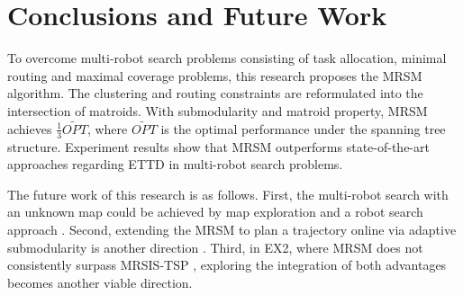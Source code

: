 \chapter{Conclusions and Future Work}
To overcome multi-robot search problems consisting of task allocation, minimal routing and maximal coverage problems, this research proposes the MRSM algorithm.
The clustering and routing constraints are reformulated into the intersection of matroids.
With submodularity and matroid property, MRSM achieves $\frac{1}{3}\widetilde{OPT}$, where $\widetilde{OPT}$ is the optimal performance under the spanning tree structure. 
Experiment results show that MRSM outperforms state-of-the-art approaches regarding ETTD in multi-robot search problems.


The future work of this research is as follows.
First, the multi-robot search with an unknown map could be achieved by map exploration and a robot search approach \cite{Lu2020map}. 
Second, extending the MRSM to plan a trajectory online via adaptive submodularity is another direction \cite{golovin2011adaptive}. 
Third, in EX2, where MRSM does not consistently surpass MRSIS-TSP \cite{li2024mrsis}, exploring the integration of both advantages becomes another viable direction.
